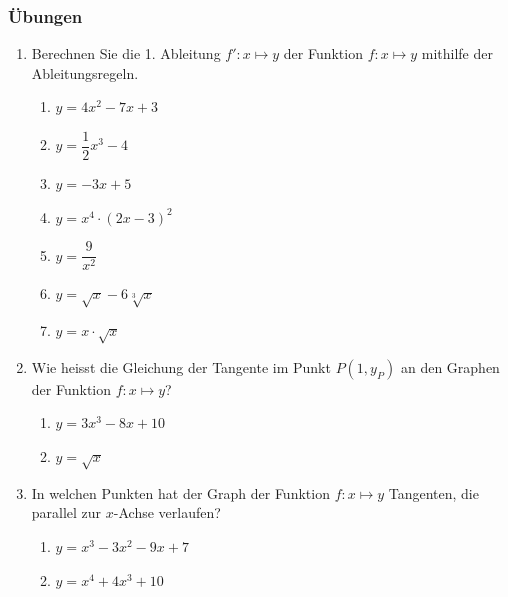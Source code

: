 \subsubsection{Übungen}
\begin{enumerate}
    \item Berechnen Sie die 1. Ableitung \( f': x \mapsto y \) der Funktion \( f \colon x \mapsto y \) mithilfe der Ableitungsregeln.
          \begin{enumerate}
              \item \( y = 4x^2 - 7x + 3 \)
              \item \( y = \dfrac{1}{2}x^3 - 4 \)
              \item $ y = -3x+5$
              \item \( y = x^4 \cdot (2x - 3)^2 \)
              \item \( y = \dfrac{9}{x^2} \)
              \item \( y = \sqrt{x} - 6\sqrt[3]{x} \)
              \item $y= x\cdot \sqrt{x}$

          \end{enumerate}

    \item Wie heisst die Gleichung der Tangente im Punkt \( P(1, y_P) \) an den Graphen der Funktion \( f \colon x \mapsto y \)?
          \begin{enumerate}
              \item \( y = 3x^3 - 8x + 10 \)
              \item  $ y= \sqrt{x}$
          \end{enumerate}

    \item In welchen Punkten hat der Graph der Funktion \( f \colon x \mapsto y \) Tangenten, die parallel zur \( x \)-Achse verlaufen?
          \begin{enumerate}
              \item \( y = x^3 - 3x^2 - 9x + 7 \)
              \item \( y = x^4 + 4x^3 + 10 \)
          \end{enumerate}


\end{enumerate}
